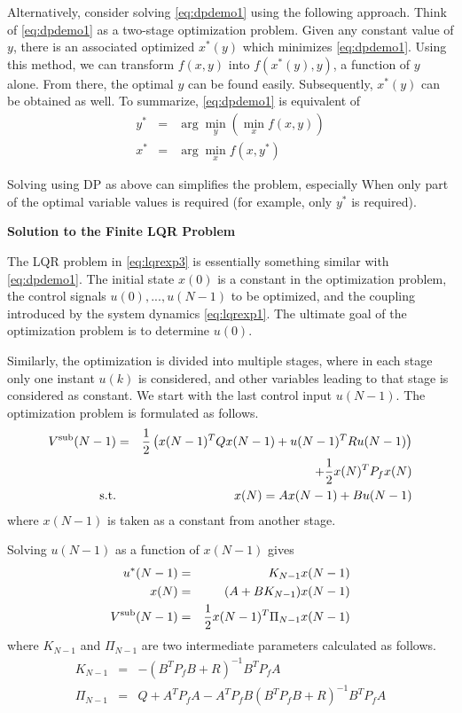 Alternatively, consider solving \eqref{eq:dpdemo1} using the following approach. Think of \eqref{eq:dpdemo1} as a two-stage optimization problem. Given any constant value of $y$, there is an associated optimized $x^*(y)$ which minimizes \eqref{eq:dpdemo1}. Using this method, we can transform $f(x,y)$ into $f\left(x^*(y), y\right)$, a function of $y$ alone. From there, the optimal $y$ can be found easily. Subsequently, $x^*(y)$ can be obtained as well. To summarize, \eqref{eq:dpdemo1} is equivalent of
\begin{eqnarray}
y^* &=& \arg\min_{y}\left(\min_{x}f(x,y)\right) \nonumber \\
x^* &=& \arg\min_{x} f(x, y^*) \nonumber
\end{eqnarray}

Solving using DP as above can simplifies the problem, especially When only part of the optimal variable values is required (for example, only $y^*$ is required).

\vspace{0.1in}
\noindent \textbf{Solution to the Finite LQR Problem}
\vspace{0.1in}

The LQR problem in \eqref{eq:lqrexp3} is essentially something similar with \eqref{eq:dpdemo1}. The initial state $x(0)$ is a constant in the optimization problem, the control signals $u(0), ..., u(N-1)$ to be optimized, and the coupling introduced by the system dynamics \eqref{eq:lqrexp1}. The ultimate goal of the optimization problem is to determine $u(0)$.

Similarly, the optimization is divided into multiple stages, where in each stage only one instant $u(k)$ is considered, and other variables leading to that stage is considered as constant. We start with the last control input $u(N-1)$. The optimization problem is formulated as follows.
\begin{eqnarray}
  V^{\textup{sub}}(N-1) &=& \dfrac{1}{2}\left(x(N-1)^TQx(N-1) + u(N-1)^TRu(N-1)\right) \nonumber \\ && + \dfrac{1}{2}x(N)^TP_fx(N) \nonumber \\
  \textup{s.t.} && x(N) = Ax(N-1) + Bu(N-1) \nonumber
\end{eqnarray}
where $x(N-1)$ is taken as a constant from another stage.

Solving $u(N-1)$ as a function of $x(N-1)$ gives
\begin{eqnarray}
  u^*(N-1) &=& K_{N-1}x(N-1) \nonumber \\
  x(N) &=& (A+BK_{N-1})x(N-1) \nonumber \\
  V^{\textup{sub}}(N-1) &=& \dfrac{1}{2}x(N-1)^T\Pi_{N-1}x(N-1) \nonumber
\end{eqnarray}
where $K_{N-1}$ and $\Pi_{N-1}$ are two intermediate parameters calculated as follows.
\begin{eqnarray}
K_{N-1} &=& -(B^TP_fB + R)^{-1}B^TP_fA \nonumber \\
\Pi_{N-1} &=& Q + A^TP_fA-A^TP_fB(B^TP_fB+R)^{-1}B^TP_fA \nonumber
\end{eqnarray}

